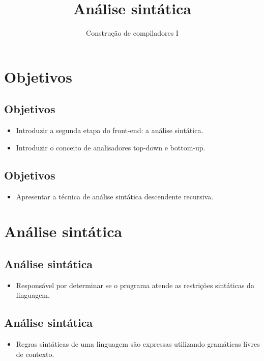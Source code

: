 \documentclass[11pt]{article}
\author{Construção de compiladores I}
\date{}
\title{Análise sintática}
\begin{document}
\maketitle
\section*{Objetivos}
\label{sec:org066f1a2}

\subsection*{Objetivos}
\label{sec:orgdc9e617}

\begin{itemize}
\item Introduzir a segunda etapa do front-end: a análise sintática.

\item Introduzir o conceito de analisadores top-down e bottom-up.
\end{itemize}
\subsection*{Objetivos}
\label{sec:org78c66fb}

\begin{itemize}
\item Apresentar a técnica de análise sintática descendente recursiva.
\end{itemize}
\section*{Análise sintática}
\label{sec:org8d4c109}

\subsection*{Análise sintática}
\label{sec:org4225fdc}

\begin{itemize}
\item Responsável por determinar se o programa atende as restrições sintáticas
da linguagem.
\end{itemize}
\subsection*{Análise sintática}
\label{sec:orgdceca08}

\begin{itemize}
\item Regras sintáticas de uma linguagem são expressas utilizando gramáticas livres de contexto.
\end{itemize}
\end{document}
